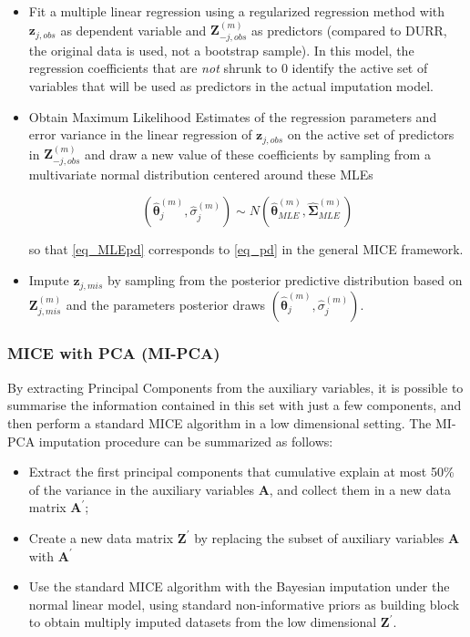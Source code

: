 	\begin{itemize}

	\item Fit a multiple linear regression using a regularized regression method with $\bm{z}_{j,obs}$ as dependent 
	 	variable and $\bm{Z}_{-j,obs}^{(m)}$ as predictors 
		(compared to DURR, the original data is used, not a bootstrap sample).
		In this model, the regression coefficients that are \emph{not} shrunk to 0 identify the active 
		set of variables that will be used as predictors in the actual imputation model.
	
	\item Obtain Maximum Likelihood Estimates of the regression parameters and error variance in the linear
		regression of $\bm{z}_{j,obs}$ on the active set of predictors in $\bm{Z}_{-j,obs}^{(m)}$ and
		draw a new value of these coefficients by sampling from a multivariate normal distribution
		centered around these MLEs

		\begin{equation}\label{eq_MLEpd}
		(\hat{\bm{\theta}}_{j}^{(m)}, \hat{\sigma}_{j}^{(m)}) \sim N(\hat{\bm{\theta}}_{MLE}^{(m)}, \hat{\bm{\Sigma}}_{MLE}^{(m)})
		\end{equation}

		so that \eqref{eq_MLEpd} corresponds to \eqref{eq_pd} in the general MICE framework.

	\item Impute $\bm{z}_{j,mis}$ by sampling from the posterior predictive distribution based 
		on $\bm{Z}_{j,mis}^{(m)}$ and the parameters posterior draws $(\hat{\bm{\theta}}_{j}^{(m)}, 
		\hat{\sigma}_{j}^{(m)})$.

	\end{itemize}

\subsubsection{MICE with PCA (MI-PCA)}
	By extracting Principal Components from the auxiliary variables, it is possible to summarise the 
	information contained in this set with just a few components, and then perform a standard MICE algorithm 
	in a low dimensional setting.
	The MI-PCA imputation procedure can be summarized as follows:

	\begin{itemize}

	\item Extract the first principal components that cumulative explain at most 50\% of the variance 
		in the auxiliary variables $\bm{A}$, and collect them in a new data matrix $\bm{A}^{'}$;
	\item Create a new data matrix $\bm{Z}^{'}$ by replacing the subset of auxiliary variables $\bm{A}$ 
		with $\bm{A}^{'}$
	\item Use the standard MICE algorithm with the Bayesian imputation under the normal linear model, using 
		standard non-informative priors \citep[p. 68, algorithm 3.1]{vanBuuren:2012}
		as building block to obtain multiply imputed datasets from the low dimensional $\bm{Z}^{'}$.
	\end{itemize}

